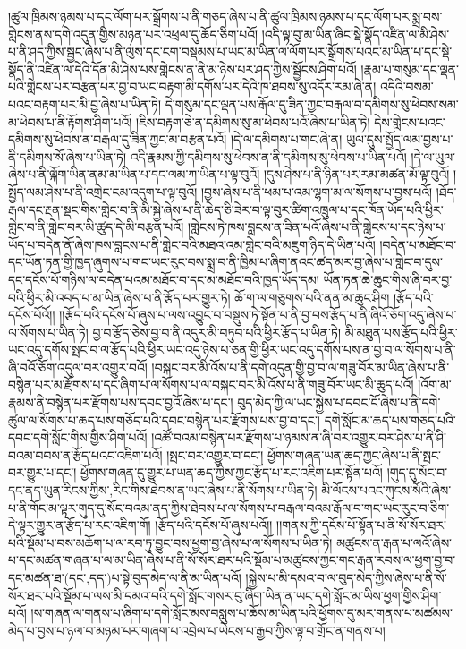 །ཚུལ་ཁྲིམས་ཉམས་པ་དང་ལོག་པར་སྒྲོགས་པ་ནི་གཅད་ཞེས་པ་ནི་ཚུལ་ཁྲིམས་ཉམས་པ་དང་ལོག་པར་སྨྲ་བས་གླེངས་ནས་དགེ་འདུན་གྱིས་མཉན་པར་འཕྲལ་དུ་ཆོད་ཅིག་པའོ། །འདི་ལྟ་བུ་མ་ཡིན་ཞིང་སྡེ་སྣོད་འཛིན་ལ་མི་ཤེས་པ་ནི་ཤད་ཀྱིས་སྦྱང་ཞེས་པ་ནི་ལུས་དང་ངག་བསྡམས་པ་ཡང་མ་ཡིན་ལ་ལོག་པར་སྒྲོགས་པའང་མ་ཡིན་པ་དང་སྡེ་སྣོད་ནི་འཛིན་ལ་དེའི་དོན་མི་ཤེས་པས་གླེངས་ན་ནི་མ་ཉེས་པར་ཤད་ཀྱིས་སྦྱོངས་ཤིག་པའོ། །རྣམ་པ་གསུམ་དང་ལྡན་པའི་གླེངས་པར་བརྩན་པར་བྱ་བ་ཡང་བརྟག་མི་དགོས་པར་དེའི་ཁ་ཐབས་སུ་འདོར་རམ་ཞེ་ན། འདིའི་བསམ་པའང་བརྟག་པར་མི་བྱ་ཞེས་པ་ཡིན་ཏེ། དེ་གསུམ་དང་ལྡན་པས་རྒོལ་དུ་ཟིན་ཀྱང་བརྒལ་བ་དམིགས་སུ་ཕེབས་སམ་མ་ཕེབས་པ་ནི་རྟོགས་ཤིག་པའོ། །ཇིས་བརྟག་ཅེ་ན་དམིགས་སུ་མ་ཕེབས་པའོ་ཞེས་པ་ཡིན་ཏེ། དེས་གླེངས་པའང་དམིགས་སུ་ཕེབས་ན་བརྒལ་དུ་ཟིན་ཀྱང་མ་བརྩན་པའོ། །དེ་ལ་དམིགས་པ་གང་ཞེ་ན། ཡུལ་དུས་སྤྱོད་ལམ་བྱས་པ་ནི་དམིགས་སོ་ཞེས་པ་ཡིན་ཏེ། འདི་རྣམས་ཀྱི་དམིགས་སུ་ཕེབས་ན་ནི་དམིགས་སུ་ཕེབས་པ་ཡིན་པའོ། །དེ་ལ་ཡུལ་ཞེས་པ་ནི་ལྐོག་ཡིན་ནམ་མ་ཡིན་པ་དང་ལམ་ཀ་ཡིན་པ་ལྟ་བུའོ། །དུས་ཤེས་པ་ནི་ཉིན་པར་རམ་མཚན་མོ་ལྟ་བུའོ། །སྤྱོད་ལམ་ཤེས་པ་ནི་འགྲེང་ངམ་འདུག་པ་ལྟ་བུའོ། །བྱས་ཞེས་པ་ནི་ཕམ་པ་འམ་ལྷག་མ་ལ་སོགས་པ་བྱས་པའོ། །ཐོད་རྒལ་དང་རྔན་སྡང་གིས་གླེང་བ་ནི་མི་སྐྱེ་ཞེས་པ་ནི་ཆེད་ཅི་ཟེར་བ་ལྟ་བུར་ཚིག་འཁྲུལ་པ་དང་ཁོན་ཡོད་པའི་ཕྱིར་གླེང་བ་ནི་གླེང་བར་མི་ཚུད་དེ་མི་བརྩན་པའོ། །གླེངས་ཏེ་ཁས་བླངས་ན་ཟིན་པའོ་ཞེས་པ་ནི་གླེངས་པ་དང་ཉེས་པ་ཡོད་པ་བདེན་ནོ་ཞེས་ཁས་བླངས་པ་ནི་གླེང་བའི་མཐའ་འམ་གླེང་བའི་མཇུག་ཉིད་དེ་ཡིན་པའོ། །བདེན་པ་མཐོང་བ་དང་ཡོན་ཏན་གྱི་ཁྱད་ཞུགས་པ་གང་ཡང་རུང་བས་སྨྲ་བ་ནི་ཁྱིམ་པ་ཞིག་ནའང་ཚད་མར་བྱ་ཞེས་པ་གླེང་བ་དུས་དང་དངོས་པོ་གཉིས་ལ་བདེན་པའམ་མཐོང་བ་དང་མ་མཐོང་བའི་ཁྱད་ཡོད་དམ། ཡོན་ཏན་ཆེ་ཆུང་གིས་ཞི་བར་བྱ་བའི་ཕྱིར་མི་འབད་པ་མ་ཡིན་ཞེས་པ་ནི་རྩོད་པར་གྱུར་ཏེ། ཆོ་ག་ལ་གཅུགས་པའི་ནན་མ་ཆུང་ཤིག །རྩོད་པའི་དངོས་པོའོ།། །།རྩོད་པའི་དངོས་པོ་ཞུས་པ་ལས་འབྱུང་བ་བསྡུས་ཏེ་སྟོན་པ་ནི་བྱ་བས་རྩོད་པ་ནི་ཞིའོ་ཅོག་འདུ་ཞེས་པ་ལ་སོགས་པ་ཡིན་ཏེ། བྱ་བ་རྩོད་ཅེས་བྱ་བ་ནི་འདུར་མི་བཏུབ་པའི་ཕྱིར་རྩོད་པ་ཡིན་ཏེ། མི་མཐུན་པས་རྩོད་པའི་ཕྱིར་ཡང་འདུ་དགོས་སྤང་བ་ལ་རྩོད་པའི་ཕྱིར་ཡང་འདུ་ཉེས་པ་ཅན་གྱི་ཕྱིར་ཡང་འདུ་དགོས་པས་ན་བྱ་བ་ལ་སོགས་པ་ནི་ཞི་བའོ་ཅོག་འདུལ་བར་འགྱུར་བའོ། །བསྐང་བར་མི་འོས་པ་ནི་དགེ་འདུན་གྱི་བྱ་བ་ལ་གཟུ་བོར་མ་ཡིན་ཞེས་པ་ནི་བསྙེན་པར་མ་རྫོགས་པ་དང་ཞིག་པ་ལ་སོགས་པ་ལ་བསྐང་བར་མི་འོས་པ་ནི་གཟུ་བོར་ཡང་མི་ཆུད་པའོ། །འོག་མ་རྣམས་ནི་བསྙེན་པར་རྫོགས་པས་དབང་བྱའོ་ཞེས་པ་དང་། བུད་མེད་ཀྱི་ལ་ཡང་སྐྱེས་པ་དབང་ངོ་ཞེས་པ་ནི་དགེ་ཚུལ་ལ་སོགས་པ་ཆད་པས་གཅོད་པའི་དབང་བསྙེན་པར་རྫོགས་པས་བྱ་བ་དང་། དགེ་སློང་མ་ཆད་པས་གཅད་པའི་དབང་དགེ་སློང་གིས་གྱིས་ཤིག་པའོ། །འཚོ་བའམ་བསྙེན་པར་རྫོགས་པ་ཉམས་ན་ཞི་བར་འགྱུར་བར་ཤེས་པ་ནི་ཤི་བའམ་བབས་ན་རྩོད་པའང་འཇིག་པའོ། །སྤང་བར་འགྱུར་བ་དང་། ཕྱོགས་གཞན་ཡན་ཆད་ཀྱང་ཞེས་པ་ནི་སྤང་བར་གྱུར་པ་དང་། ཕྱོགས་གཞན་དུ་གྱུར་པ་ཡན་ཆད་ཀྱིས་ཀྱང་རྩོད་པ་རང་འཇིག་པར་སྟོན་པའོ། །གུད་དུ་སོང་བ་དང་ནད་ཡུན་{རིངས་ཀྱིས་,རིང་གིས་}ཐེབས་ན་ཡང་ཞེས་པ་ནི་སོགས་པ་ཡིན་ཏེ། མི་ལོངས་པའང་ཀུངས་སོའི་ཞེས་པ་ནི་གོང་མ་ལྟར་གུད་དུ་སོང་བའམ་ནད་ཀྱིས་ཐེབས་པ་ལ་སོགས་པ་བརྒལ་བའམ་རྒོལ་བ་གང་ཡང་རུང་བ་ཅིག་དེ་ལྟར་གྱུར་ན་རྩོད་པ་རང་འཇིག་གོ། །རྩོད་པའི་དངོས་པོ་ཞུས་པའོ།། །།གནས་ཀྱི་དངོས་པོ་སྟོན་པ་ནི་སོ་སོར་ཐར་པའི་སྡོམ་པ་བས་མཆོག་པ་ལ་རབ་ཏུ་བྱུང་བས་ཕྱག་བྱ་ཞེས་པ་ལ་སོགས་པ་ཡིན་ཏེ། མཚུངས་ན་རྒན་པ་ལའོ་ཞེས་པ་དང་མཚན་གཞན་པ་ལ་མ་ཡིན་ཞེས་པ་ནི་སོ་སོར་ཐར་པའི་སྡོམ་པ་མཚུངས་ཀྱང་གང་རྒན་རབས་ལ་ཕྱག་བྱ་བ་དང་མཚན་ཐ་(དང་‚དད་)པ་སྟེ་བུད་མེད་ལ་ནི་མ་ཡིན་པའོ། །སྐྱེས་པ་མི་དམའ་བ་ལ་བུད་མེད་ཀྱིས་ཞེས་པ་ནི་སོ་སོར་ཐར་པའི་སྡོམ་པ་ལས་མི་དམའ་བའི་དགེ་སློང་གསར་བུ་ཞིག་ཡིན་ན་ཡང་དགེ་སློང་མ་ཡིས་ཕྱག་གྱིས་ཤིག་པའོ། །ས་གཞན་ལ་གནས་པ་ཞིག་པ་དགེ་སློང་མས་བསླུས་པ་ཆོས་མ་ཡིན་པའི་ཕྱོགས་དུ་མར་གནས་པ་མཚམས་མེད་པ་བྱས་པ་ཉལ་བ་མཉམ་པར་གཞག་པ་འབྲེལ་པ་ཡེངས་པ་རྒྱབ་ཀྱིས་ལྟ་བ་གྲོང་ན་གནས་པ། 